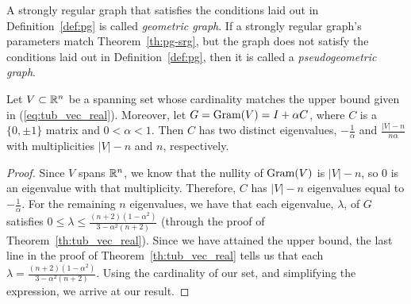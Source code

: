 A strongly regular graph that satisfies the conditions laid out in Definition~\ref{def:pg} is called {\it geometric graph}. If a strongly regular graph's parameters match Theorem~\ref{th:pg-srg}, but the graph does not satisfy the conditions laid out in Definition~\ref{def:pg}, then it is called a {\it pseudogeometric graph}.

\begin{lemma}\label{lem:eigen-calderbank}
 Let $V \subset \mathbb{R}^n$ be a spanning set whose cardinality matches the upper bound given in (\ref{eq:tub_vec_real}). Moreover, let $G = \text{Gram}(V) = I + \alpha C$, where $C$ is a $\{0,\pm 1\}$ matrix and $0 < \alpha < 1$. Then $C$ has two distinct eigenvalues, $-\frac{1}{\alpha}$ and $\frac{|V|-n}{n\alpha}$ with multiplicities $|V|-n$ and $n$, respectively.

 \begin{proof}
  Since $V$ spans $\mathbb{R}^n$, we know that the nullity of $\text{Gram}(V)$ is $|V| - n$, so 0 is an eigenvalue with that multiplicity. Therefore, $C$ has $|V| - n$ eigenvalues equal to $-\frac{1}{\alpha}$. For the remaining $n$ eigenvalues, we have that each eigenvalue, $\lambda$, of $G$ satisfies $0 \leq \lambda \leq \frac{(n+2)(1-\alpha^2)}{3-\alpha^2(n+2)}$ (through the proof of Theorem~\ref{th:tub_vec_real}). Since we have attained the upper bound, the last line in the proof of Theorem~\ref{th:tub_vec_real} tells us that each $\lambda = \frac{(n+2)(1-\alpha^2)}{3-\alpha^2(n+2)}$. Using the cardinality of our set, and simplifying the expression, we arrive at our result.
 \end{proof}

\end{lemma}


